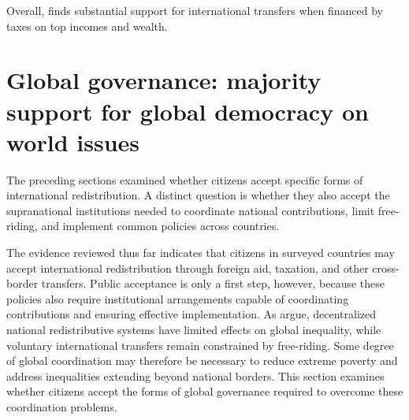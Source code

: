 \documentclass[11pt,a4paper]{article}
\begin{document}
Overall, \citet{fabre_public_2026} finds substantial support for international transfers when financed by  taxes on top incomes and wealth. 

\section{Global governance: majority support for global democracy on world issues}

The preceding sections examined whether citizens accept specific forms of international redistribution. A distinct question is whether they also accept the supranational institutions needed to coordinate national contributions, limit free-riding, and implement common policies across countries.

The evidence reviewed thus far indicates that citizens in surveyed countries may accept international redistribution through foreign aid, taxation, and other cross-border transfers. Public acceptance is only a first step, however, because these policies also require institutional arrangements capable of coordinating contributions and ensuring effective implementation. 
As \citet{kopczuk_limitations_2005} argue, decentralized national redistributive systems have limited effects on global inequality, while voluntary international transfers remain constrained by free-riding. Some degree of global coordination may therefore be necessary to reduce extreme poverty and address inequalities extending beyond national borders. This section examines whether citizens accept the forms of global governance required to overcome these coordination problems.
\end{document}
